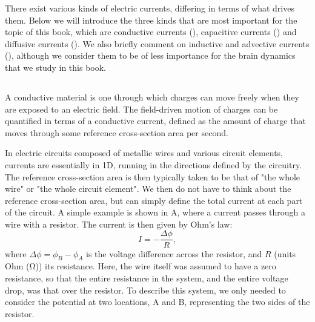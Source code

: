 There exist various kinds of electric currents, differing in terms of what drives them. Below we will introduce the three kinds that are most important for the topic of this book, which are conductive currents (),  capacitive currents () and diffusive currents (). We also briefly comment on inductive and advective currents (), although we consider them to be of less importance for the brain dynamics that we study in this book. 


\subsection{}
\label{sec:Basics:ConductiveCurrent}
A conductive material  is one through which charges can move freely when they are exposed to an electric field. The field-driven motion of charges can be quantified in terms of a conductive current, defined as the amount of charge that moves through some reference cross-section area per second.

In electric circuits composed of metallic wires and various circuit elements, currents are essentially in 1D, running in the directions defined by the circuitry. The reference cross-section area is then typically taken to be that of "the whole wire" or "the whole circuit element". We then do not have to think about the reference cross-section area, but can simply define the total current at each part of the circuit. A simple example is shown in A, where a current passes through a wire with a resistor. The current is then given by Ohm's law:
\begin{equation}
I = - \frac{\Delta \phi}{R},
\label{eq:Basics:Ohm_R}
\end{equation}
where $\Delta \phi = \phi_B-\phi_A$ is the voltage difference across the resistor, and $R$ (units Ohm (\si{\ohm})) its resistance. Here, the wire itself was assumed to have a zero resistance, so that the entire resistance in the system, and the entire voltage drop, was that over the resistor. To describe this system, we only needed to consider the potential at two locations, A and B, representing the two sides of the resistor.

